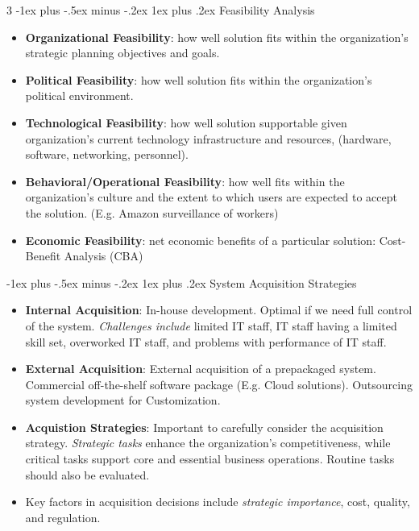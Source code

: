 \documentclass[10pt, landscape]{article}
\makeatletter
\renewcommand{\subsubsection}{\@startsection{subsubsection}{3}{0mm}%
                                {-1ex plus -.5ex minus -.2ex}%
                                {1ex plus .2ex}%
                                {\normalfont\small\bfseries}}
\makeatother
\begin{document}
\begin{multicols*}{3}
\subsubsection{Feasibility Analysis}
\begin{itemize}
    \item \textbf{Organizational Feasibility}: how well solution fits within the organization’s strategic planning objectives and goals.
    \item \textbf{Political Feasibility}: how well solution fits within the organization’s political environment.
    \item \textbf{Technological Feasibility}: how well solution supportable given organization’s current technology infrastructure and resources, (hardware, software, networking, personnel).    
    \item \textbf{Behavioral/Operational Feasibility}: how well fits within the organization’s culture and the extent to which users are expected to accept the solution. (E.g. Amazon surveillance of workers)
    \item \textbf{Economic Feasibility}: net economic benefits of a particular solution: Cost-Benefit Analysis (CBA)
\end{itemize}

\subsubsection{System Acquisition Strategies}
\begin{itemize}
\item \textbf{Internal Acquisition}: In-house development. Optimal if we need full control of the system. \textit{Challenges include} limited IT staff, IT staff having a limited skill set, overworked IT staff, and problems with performance of IT staff.
\item \textbf{External Acquisition}:  External acquisition of a prepackaged system. Commercial off-the-shelf software package (E.g. Cloud solutions). Outsourcing system development for Customization.
\item \textbf{Acquistion Strategies}: Important to carefully consider the acquisition strategy. \textit{Strategic tasks} enhance the organization's competitiveness, while critical tasks support core and essential business operations. Routine tasks should also be evaluated. 
\item Key factors in acquisition decisions include \textit{strategic importance}, cost, quality, and regulation.
\end{itemize}


\end{multicols*}
\end{document}
